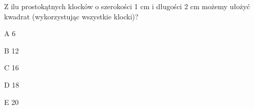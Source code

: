 \begin{tresc}
Z ilu prostokątnych klocków o szerokości 1 cm i długości 2 cm możemy ułożyć kwadrat (wykorzystując wszystkie klocki)?
\end{tresc}
\begin{wariant}{A} 6 \end{wariant}
\begin{wariant}{B} 12 \end{wariant}
\begin{wariant}{C} 16 \end{wariant}
\begin{wariant}{D} 18 \end{wariant}
\begin{wariant}{E} 20 \end{wariant}
